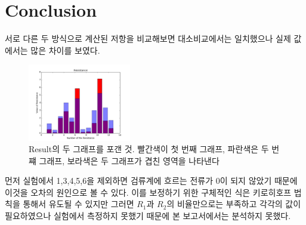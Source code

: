 \documentclass[a4paper]{article}
\begin{document}
	\section{Conclusion}
	서로 다른 두 방식으로 계산된 저항을 비교해보면 대소비교에서는 일치했으나 실제 값에서는 많은 차이를 보였다.
	\begin{figure}[h]
	\centering
		\includegraphics[width=0.4\textwidth]{img/figure3.png}
		\caption{Result의 두 그래프를 포갠 것. 빨간색이 첫 번째 그래프, 파란색은 두 번쨰 그래프, 보라색은 두 그래프가 겹친 영역을 나타낸다}
	\end{figure}

	먼저 실험에서 1,3,4,5,6을 제외하면 검류계에 흐르는 전류가 0이 되지 않았기 때문에 이것을 오차의 원인으로 볼 수 있다.
	이를 보정하기 위한 구체적인 식은 키로히호프 법칙을 통해서 유도될 수 있지만 그러면 $R_1$과 $R_2$의 비율만으로는 부족하고 각각의 값이 필요하였으나 실험에서 측정하지 못했기 때문에 본 보고서에서는 분석하지 못했다. 
\end{document}
